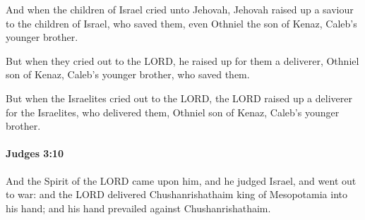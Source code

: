 			\begin{versebox}
					\item[BHS] 
					\item[ASV] And when the children of Israel cried unto Jehovah, Jehovah raised up a saviour to the children of Israel, who saved them, even Othniel the son of Kenaz, Caleb's younger brother.
					\item[NIV] But when they cried out to the LORD, he raised up for them a deliverer, Othniel son of Kenaz, Caleb’s younger brother, who saved them.
					\item[NRSV] But when the Israelites cried out to the LORD, the LORD raised up a deliverer for the Israelites, who delivered them, Othniel son of Kenaz, Caleb’s younger brother.
			\end{versebox}

		\paragraph{Judges 3:10} %
			\label{JUDGES-3-10}

			And the Spirit of the LORD came upon him, and he judged Israel, and went out to war: and the LORD delivered Chushanrishathaim king of Mesopotamia into his hand; and his hand prevailed against Chushanrishathaim.

